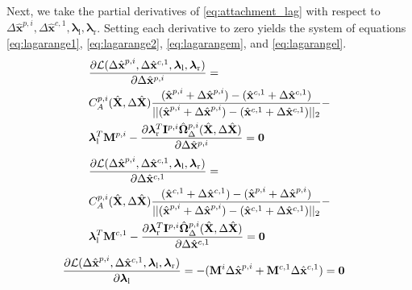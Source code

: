 Next, we take the partial derivatives of \eqref{eq:attachment_lag} with respect to $\Delta \hat{\textbf{x}}^{p, i}, \Delta \hat{\mathbf{x}}^{c,1},
\boldsymbol{\lambda}_\text{l}, \boldsymbol{\lambda}_\text{r}$. 
Setting each derivative to zero yields the system of equations \eqref{eq:lagarange1}, \eqref{eq:lagarange2}, \eqref{eq:lagarangem}, and \eqref{eq:lagarangel}.
\begin{align}
    \label{eq:lagarange1}
    \begin{split}
     & \frac{\partial \mathcal{L}(\Delta \hat{\textbf{x}}^{p, i}, \Delta  \hat{\mathbf{x}}^{c,1},  \boldsymbol{\lambda}_\text{l}, \boldsymbol{\lambda}_\text{r})}{\partial \Delta  \hat{\mathbf{x}}^{p,i}} =  \\
     & C^{p,i}_A(\hat{\mathbf{X}}, \Delta \hat{\mathbf{X}})\frac{(\hat{\textbf{x}}^{p, i}+\Delta \hat{\textbf{x}}^{p, i}) - (\hat{\mathbf{x}}^{c,1}+\Delta \hat{\mathbf{x}}^{c,1})}{||(\hat{\textbf{x}}^{p, i}+\Delta \hat{\textbf{x}}^{p, i}) - (\hat{\mathbf{x}}^{c,1}+\Delta \hat{\mathbf{x}}^{c,1})||_2}-\\
     &  \boldsymbol{\lambda}^T_\text{l}\mathbf{M}^{p, i} - \frac{\partial \boldsymbol{\lambda}^T_\text{r}\mathbf{I}^{p, i}   \hat{\boldsymbol{\Omega}}^{p, i} _\Delta (\hat{\mathbf{X}},\Delta \hat{\mathbf{X}} )}{\partial \Delta  \hat{\mathbf{x}}^{p,i}} = \textbf{0}
     \end{split}   
\end{align}
\begin{align}
    \label{eq:lagarange2}
    \begin{split}
     & \frac{\partial \mathcal{L}(\Delta \hat{\textbf{x}}^{p, i}, \Delta  \hat{\mathbf{x}}^{c,1},  \boldsymbol{\lambda}_\text{l}, \boldsymbol{\lambda}_\text{r})}{\partial \Delta  \hat{\mathbf{x}}^{c,1}} =  \\
     & C^{p,i}_A(\hat{\mathbf{X}}, \Delta \hat{\mathbf{X}})\frac{(\hat{\mathbf{x}}^{c,1}+\Delta \hat{\mathbf{x}}^{c,1})-(\hat{\textbf{x}}^{p, i}+\Delta \hat{\textbf{x}}^{p, i}) }{||(\hat{\textbf{x}}^{p, i}+\Delta \hat{\textbf{x}}^{p, i}) - (\hat{\mathbf{x}}^{c,1}+\Delta \hat{\mathbf{x}}^{c,1})||_2}-\\
     &  \boldsymbol{\lambda}^T_\text{l}\mathbf{M}^{c, 1} - \frac{\partial \boldsymbol{\lambda}^T_\text{r}\mathbf{I}^{p, i}   \hat{\boldsymbol{\Omega}}^{p, i} _\Delta (\hat{\mathbf{X}},\Delta \hat{\mathbf{X}} )}{\partial \Delta  \hat{\mathbf{x}}^{c,1}}  = \textbf{0}
     \end{split}   
\end{align}
\begin{align}
    \label{eq:lagarangem}
      & \frac{\partial \mathcal{L}(\Delta \hat{\textbf{x}}^{p, i}, \Delta  \hat{\mathbf{x}}^{c,1},  \boldsymbol{\lambda}_\text{l}, \boldsymbol{\lambda}_\text{r})}{\partial \boldsymbol{\lambda}_\text{l}} = -(\mathbf{M}^i  \Delta \hat{\textbf{x}}^{p, i} + \mathbf{M}^{c, 1}  \Delta \hat{\mathbf{x}}^{c,1}) = \textbf{0}
\end{align}
